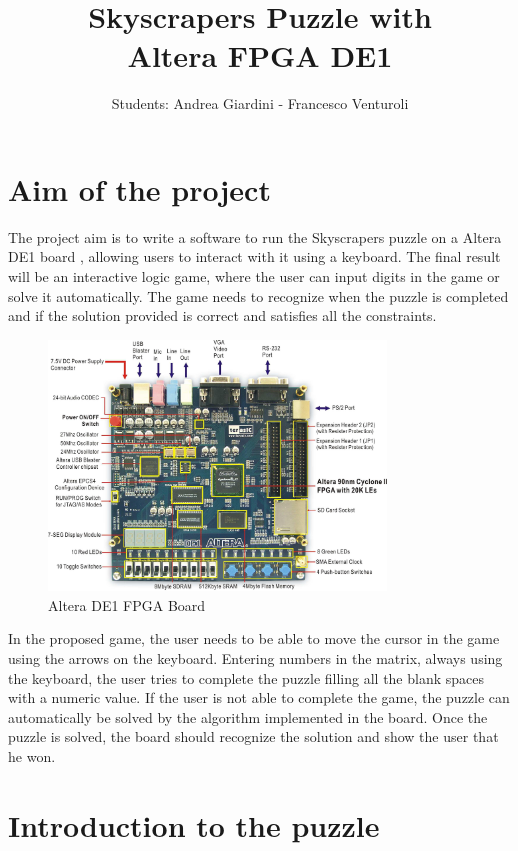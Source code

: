 \documentclass[12pt]{report}
\title{Skyscrapers Puzzle with\\
Altera FPGA DE1}
\date{\vspace{-5ex}}
\begin{document}
\author{Students: Andrea Giardini - Francesco Venturoli}
\maketitle

\chapter*{Aim of the project}

The project aim is to write a software to run the Skyscrapers puzzle on
a Altera DE1 board \cite{AlteraDE1Board}, allowing users to interact with
it using a keyboard. The final result will be an interactive logic game,
where the user can input digits in the game or solve it automatically. The
game needs to recognize when the puzzle is completed and if the solution
provided is correct and satisfies all the constraints.

\begin{figure}[H]
  \centering
  \includegraphics[keepaspectratio,width=0.8\textwidth]{images/Altera_DE1_Board.jpg}
  \caption{Altera DE1 FPGA Board}
\end{figure}

In the proposed game, the user needs to be able to move the cursor in the
game using the arrows on the keyboard. Entering numbers in the matrix, always
using the keyboard, the user tries to complete the puzzle filling all the
blank spaces with a numeric value. If the user is not able to complete the
game, the puzzle can automatically be solved by the algorithm implemented
in the board. Once the puzzle is solved, the board should recognize the
solution and show the user that he won.

\chapter*{Introduction to the puzzle}
\end{document}

